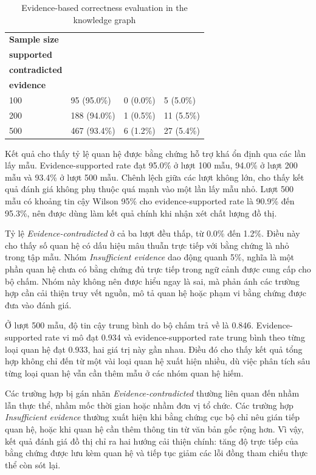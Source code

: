 \begin{table}[h]
\centering
\caption{Evidence-based correctness evaluation in the knowledge graph}
\label{tab:triplet_evaluation_summary}
\renewcommand{\arraystretch}{1.22}
\begin{tabularx}{\textwidth}{|p{}|p{}|p{}|X|}
\hline
\textbf{Sample size} & \makecell[l]{\textbf{Evidence-}\\\textbf{supported}} & \makecell[l]{\textbf{Evidence-}\\\textbf{contradicted}} & \makecell[l]{\textbf{Insufficient}\\\textbf{evidence}} \\
\hline
100 & 95 (95.0\%) & 0 (0.0\%) & 5 (5.0\%) \\
\hline
200 & 188 (94.0\%) & 1 (0.5\%) & 11 (5.5\%) \\
\hline
500 & 467 (93.4\%) & 6 (1.2\%) & 27 (5.4\%) \\
\hline
\end{tabularx}
\end{table}

Kết quả cho thấy tỷ lệ quan hệ được bằng chứng hỗ trợ khá ổn định qua các lần lấy mẫu. Evidence-supported rate đạt 95.0\% ở lượt 100 mẫu, 94.0\% ở lượt 200 mẫu và 93.4\% ở lượt 500 mẫu. Chênh lệch giữa các lượt không lớn, cho thấy kết quả đánh giá không phụ thuộc quá mạnh vào một lần lấy mẫu nhỏ. Lượt 500 mẫu có khoảng tin cậy Wilson 95\% cho evidence-supported rate là 90.9\% đến 95.3\%, nên được dùng làm kết quả chính khi nhận xét chất lượng đồ thị.

Tỷ lệ \textit{Evidence-contradicted} ở cả ba lượt đều thấp, từ 0.0\% đến 1.2\%. Điều này cho thấy số quan hệ có dấu hiệu mâu thuẫn trực tiếp với bằng chứng là nhỏ trong tập mẫu. Nhóm \textit{Insufficient evidence} dao động quanh 5\%, nghĩa là một phần quan hệ chưa có bằng chứng đủ trực tiếp trong ngữ cảnh được cung cấp cho bộ chấm. Nhóm này không nên được hiểu ngay là sai, mà phản ánh các trường hợp cần cải thiện truy vết nguồn, mô tả quan hệ hoặc phạm vi bằng chứng được đưa vào đánh giá.

Ở lượt 500 mẫu, độ tin cậy trung bình do bộ chấm trả về là 0.846. Evidence-supported rate vi mô đạt 0.934 và evidence-supported rate trung bình theo từng loại quan hệ đạt 0.933, hai giá trị này gần nhau. Điều đó cho thấy kết quả tổng hợp không chỉ đến từ một vài loại quan hệ xuất hiện nhiều, dù việc phân tích sâu từng loại quan hệ vẫn cần thêm mẫu ở các nhóm quan hệ hiếm.

Các trường hợp bị gán nhãn \textit{Evidence-contradicted} thường liên quan đến nhầm lẫn thực thể, nhầm mốc thời gian hoặc nhầm đơn vị tổ chức. Các trường hợp \textit{Insufficient evidence} thường xuất hiện khi bằng chứng cục bộ chỉ nêu gián tiếp quan hệ, hoặc khi quan hệ cần thêm thông tin từ văn bản gốc rộng hơn. Vì vậy, kết quả đánh giá đồ thị chỉ ra hai hướng cải thiện chính: tăng độ trực tiếp của bằng chứng được lưu kèm quan hệ và tiếp tục giảm các lỗi đồng tham chiếu thực thể còn sót lại.


